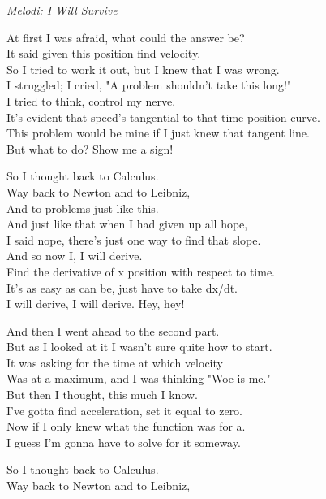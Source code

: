 {\footnotesize\textit{Melodi: I Will Survive}}\par
\vspace{10pt}
At first I was afraid, what could the answer be?\\
It said given this position find velocity.\\
So I tried to work it out, but I knew that I was wrong.\\
I struggled; I cried, "A problem shouldn't take this long!"\\
I tried to think, control my nerve.\\
It's evident that speed's tangential to that time-position curve.\\
This problem would be mine if I just knew that tangent line.\\
But what to do? Show me a sign!\par
\vspace{7pt}
So I thought back to Calculus.\\
Way back to Newton and to Leibniz,\\
And to problems just like this.\\
And just like that when I had given up all hope,\\
I said nope, there's just one way to find that slope.\\
And so now I, I will derive.\\
Find the derivative of x position with respect to time.\\
It's as easy as can be, just have to take dx/dt.\\
I will derive, I will derive. Hey, hey!\par
\vspace{7pt}
And then I went ahead to the second part.\\
But as I looked at it I wasn't sure quite how to start.\\
It was asking for the time at which velocity\\
Was at a maximum, and I was thinking "Woe is me."\\
But then I thought, this much I know.\\
I've gotta find acceleration, set it equal to zero.\\
Now if I only knew what the function was for a.\\
I guess I'm gonna have to solve for it someway.\par
\newpage
So I thought back to Calculus.\\
Way back to Newton and to Leibniz,\\
